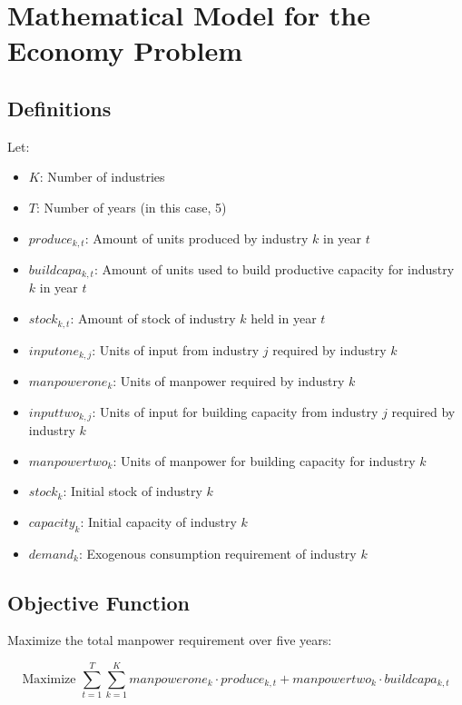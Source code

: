\documentclass{article}
\begin{document}
\section*{Mathematical Model for the Economy Problem}

\subsection*{Definitions}

Let:
\begin{itemize}
    \item \( K \): Number of industries
    \item \( T \): Number of years (in this case, 5)
    \item \( produce_{k, t} \): Amount of units produced by industry \( k \) in year \( t \)
    \item \( buildcapa_{k, t} \): Amount of units used to build productive capacity for industry \( k \) in year \( t \)
    \item \( stock_{k, t} \): Amount of stock of industry \( k \) held in year \( t \)
    \item \( inputone_{k, j} \): Units of input from industry \( j \) required by industry \( k \)
    \item \( manpowerone_{k} \): Units of manpower required by industry \( k \)
    \item \( inputtwo_{k, j} \): Units of input for building capacity from industry \( j \) required by industry \( k \)
    \item \( manpowertwo_{k} \): Units of manpower for building capacity for industry \( k \)
    \item \( stock_{k} \): Initial stock of industry \( k \)
    \item \( capacity_{k} \): Initial capacity of industry \( k \)
    \item \( demand_{k} \): Exogenous consumption requirement of industry \( k \)
\end{itemize}

\subsection*{Objective Function}

Maximize the total manpower requirement over five years:

\[
\text{Maximize } \sum_{t=1}^{T} \sum_{k=1}^{K} manpowerone_{k} \cdot produce_{k, t} + manpowertwo_{k} \cdot buildcapa_{k, t}
\]
\end{document}
